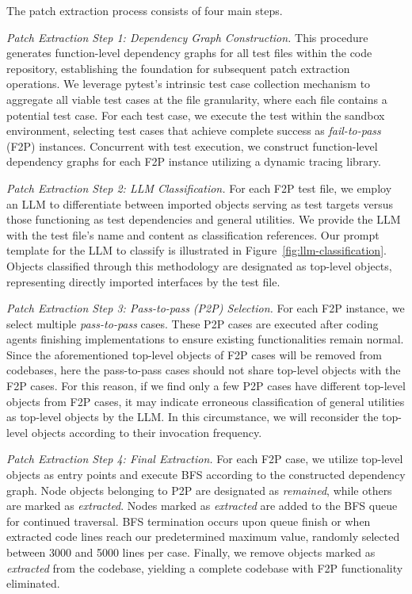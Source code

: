 \documentclass{article}
\newcommand{\myparagraph}[1]{\noindent{\bf #1}}
\begin{document}
\myparagraph{Patch Extraction.}
The patch extraction process consists of four main steps.

\emph{Patch Extraction Step 1: Dependency Graph Construction.}
This procedure generates function-level dependency graphs for all test files within the code repository, establishing the foundation for subsequent patch extraction operations. 
%
We leverage pytest's intrinsic test case collection mechanism to aggregate all viable test cases at the file granularity, where each file contains a potential test case. 
%
For each test case, we execute the test within the sandbox environment, selecting test cases that achieve complete success as \textit{fail-to-pass} (F2P) instances. 
%
Concurrent with test execution, we construct function-level dependency graphs for each F2P instance utilizing a dynamic tracing library.

\emph{Patch Extraction Step 2: LLM Classification.}
For each F2P test file, we employ an LLM to differentiate between imported objects serving as test targets versus those functioning as test dependencies and general utilities. 
%
We provide the LLM with the test file's name and content as classification references. 
%
Our prompt template for the LLM to classify is illustrated in Figure~\ref{fig:llm-classification}. 
%
Objects classified through this methodology are designated as top-level objects, representing directly imported interfaces by the test file.

\emph{Patch Extraction Step 3: Pass-to-pass (P2P) Selection.}
For each F2P instance, we select multiple \textit{pass-to-pass} cases. These P2P cases are executed after coding agents finishing implementations to ensure existing functionalities remain normal. 
%
Since the aforementioned top-level objects of F2P cases will be removed from codebases, here the pass-to-pass cases should not share top-level objects with the F2P cases. For this reason, if we find only a few P2P cases have different top-level objects from F2P cases, it may indicate erroneous classification of general utilities as top-level objects by the LLM. In this circumstance, we will reconsider the top-level objects according to their invocation frequency.
%

\emph{Patch Extraction Step 4: Final Extraction.}
For each F2P case, we utilize top-level objects as entry points and execute BFS according to the constructed dependency graph. 
%
Node objects belonging to P2P are designated as \textit{remained}, while others are marked as \textit{extracted}. 
%
Nodes marked as \textit{extracted} are added to the BFS queue for continued traversal. 
%
BFS termination occurs upon queue finish or when extracted code lines reach our predetermined maximum value, randomly selected between 3000 and 5000 lines per case. 
%
Finally, we remove objects marked as \textit{extracted} from the codebase, yielding a complete codebase with F2P functionality eliminated.
\end{document}

